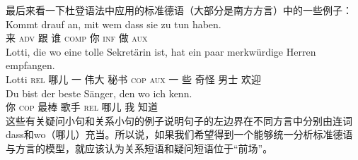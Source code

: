 最后来看一下杜登语法\citep[§1347]{Duden2005-Authors}中应用的标准德语（大部分是南方方言）中的一些例子：
\eal
\ex 
\gll Kommt drauf an, mit wem dass sie zu tun haben.\\
     来 \textsc{adv} \partic{} 跟 谁 \textsc{comp} 你 \textsc{inf} 做 \textsc{aux}\\
\zl
\eal
\ex 
\gll Lotti, die wo eine tolle Sekretärin ist, hat ein paar merkwürdige Herren empfangen.\\
    Lotti  \textsc{rel} 哪儿 一 伟大 秘书 \textsc{cop} \textsc{aux} 一 些 奇怪 男士 欢迎\\
\ex 
\gll Du bist der beste Sänger, den wo ich kenn.\\
     你 \textsc{cop}  最棒 歌手   \textsc{rel} 哪儿 我 知道\\
\zl
这些有关疑问小句和关系小句的例子说明句子的左边界在不同方言中分别由连词dass和wo（哪儿）充当。所以说，如果我们希望得到一个能够统一分析标准德语与方言的模型，就应该认为关系短语和疑问短语位于“前场”。

